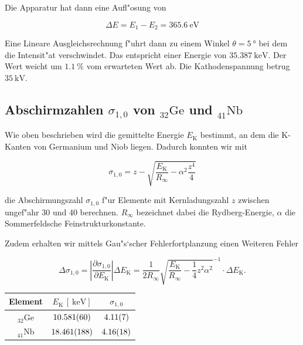 		Die Apparatur hat dann eine Aufl"osung von

		\begin{equation}
			\Delta E = E_1 - E_2 = \SI{365.6}{\electronvolt}
		\end{equation}

		Eine Lineare Ausgleichsrechnung f"uhrt dann zu einem Winkel $\theta = \SI{5}{\degree}$ bei dem die Intensit"at verschwindet.
		Das entspricht einer Energie von $\SI{35.387}{\kilo \electronvolt}$. Der Wert weicht um $\SI{1.1}{\percent}$ vom erwarteten Wert ab. Die Kathodenspannung betrug $\SI{35}{\kilo \volt}$.

	\subsection{Abschirmzahlen $\sigma_{1,0}$ von ${}_{32}^{}\mathrm{Ge}$ und ${}_{41}^{}\mathrm{Nb}$}
		\label{subsec:abschirm1}
		Wie oben beschrieben wird die gemittelte Energie $E_\mathrm{K}$ bestimmt, an dem die K-Kanten von Germanium und Niob liegen. 
		Dadurch konnten wir mit 

		\begin{equation}
			\sigma_{1,0} = z - \sqrt{\frac{E_\mathrm{K}}{R_\infty} - \alpha^2 \frac{z^4}{4}}
		\end{equation}

		die Abschirmungszahl $\sigma_{1,0}$ f"ur Elemente mit Kernladungszahl $z$ zwischen ungef"ahr 30 und 40 berechnen.
		$R_\infty$ bezeichnet dabei die Rydberg-Energie, $\alpha$ die Sommerfeldsche Feinstrukturkonstante.

		Zudem erhalten wir mittels Gau"s`scher Fehlerfortplanzung einen Weiteren Fehler

		\begin{equation}
			\Delta \sigma_{1,0} = \left| \frac{\partial \sigma_{1,0}}{\partial E_\mathrm{K}} \right| \Delta E_\mathrm{K} =
			\frac{1}{2 R_{\infty}} \sqrt{\frac{E_\mathrm{K}}{R_\infty} - \frac{1}{4} z^2 \alpha^2}^{-1}
			\cdot \Delta E_\mathrm{K} .
		\end{equation}

		\begin{table}[h!]
			\centering
			\begin{tabular}{|c|c|c|}
				\hline
				Element & 
				$E_\mathrm{K}\,[\SI{}{\kilo \electronvolt}]$ & 
				$\sigma_{1,0}$ \\
				\hline \hline
				${}_{32}^{}\mathrm{Ge}$ & $\SI{10.581 (60)}{}$ & $\SI{4.11 (7)}{}$ \\
				${}_{41}^{}\mathrm{Nb}$ & $\SI{18.461 (188)}{}$ & $\SI{4.16 (18)}{}$ \\
				\hline
			\end{tabular}
		\end{table}

